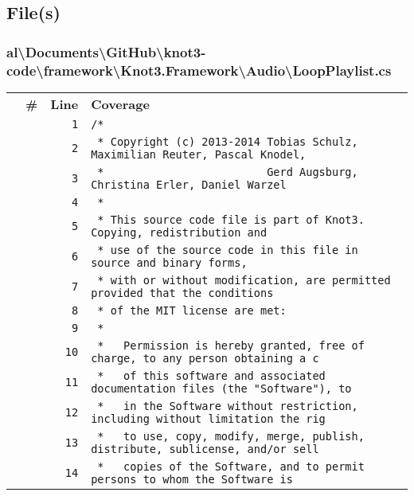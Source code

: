 \documentclass[a4paper,10pt]{article}
\begin{document}
\subsection{File(s)}
\subsubsection{al\textbackslash Documents\textbackslash GitHub\textbackslash knot3-code\textbackslash framework\textbackslash Knot3.Framework\textbackslash Audio\textbackslash LoopPlaylist.cs}
\begin{longtable}[l]{lrrl}
\textbf{} & \textbf{\#} & \textbf{Line} & \textbf{Coverage}\\
\cellcolor{gray} &  & \verb~1~ & \verb~/*~\\
\cellcolor{gray} &  & \verb~2~ & \verb~ * Copyright (c) 2013-2014 Tobias Schulz, Maximilian Reuter, Pascal Knodel,~\\
\cellcolor{gray} &  & \verb~3~ & \verb~ *                         Gerd Augsburg, Christina Erler, Daniel Warzel~\\
\cellcolor{gray} &  & \verb~4~ & \verb~ *~\\
\cellcolor{gray} &  & \verb~5~ & \verb~ * This source code file is part of Knot3. Copying, redistribution and~\\
\cellcolor{gray} &  & \verb~6~ & \verb~ * use of the source code in this file in source and binary forms,~\\
\cellcolor{gray} &  & \verb~7~ & \verb~ * with or without modification, are permitted provided that the conditions~\\
\cellcolor{gray} &  & \verb~8~ & \verb~ * of the MIT license are met:~\\
\cellcolor{gray} &  & \verb~9~ & \verb~ *~\\
\cellcolor{gray} &  & \verb~10~ & \verb~ *   Permission is hereby granted, free of charge, to any person obtaining a c~\\
\cellcolor{gray} &  & \verb~11~ & \verb~ *   of this software and associated documentation files (the "Software"), to ~\\
\cellcolor{gray} &  & \verb~12~ & \verb~ *   in the Software without restriction, including without limitation the rig~\\
\cellcolor{gray} &  & \verb~13~ & \verb~ *   to use, copy, modify, merge, publish, distribute, sublicense, and/or sell~\\
\cellcolor{gray} &  & \verb~14~ & \verb~ *   copies of the Software, and to permit persons to whom the Software is~\\

\end{longtable}
\end{document}
